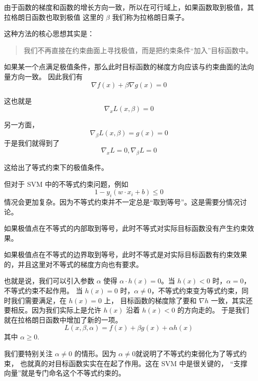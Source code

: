 由于函数的梯度和函数的增长方向一致，所以在可行域上，如果函数取到极值，其拉格朗日函数也取到极值
这里的 $\beta$ 我们称为拉格朗日乘子。

这种方法的核心思想其实是：

\begin{quote}
我们不再直接在约束曲面上寻找极值，而是把约束条件“加入”目标函数中。
\end{quote}

如果某一个点满足极值条件，那么此时目标函数的梯度方向应该与约束曲面的法向量方向一致。
因此我们有
\begin{equation}
\nabla f(x)+\beta \nabla g(x)=0
\end{equation}

这也就是
\begin{equation}
\nabla_x L(x,\beta)=0
\end{equation}

另一方面，
\begin{equation}
\nabla_\beta L(x,\beta) = g(x) = 0
\end{equation}
于是我们就得到了 
\begin{equation}
\nabla_x L = 0, \nabla_\beta L = 0
\end{equation}

这给出了等式约束下的极值条件。

但对于 SVM 中的不等式约束问题，例如
\begin{equation}
1-y_i(w\cdot x_i+b)\le0
\end{equation}
情况会更加复杂。因为不等式约束并不一定总是“取到等号”。这是需要分情况讨论。

如果极值点在不等式的内部取到等号，此时不等式对实际目标函数没有产生约束效果。

如果极值点在不等式的边界取到等号，此时不等式是对实际目标函数有约束效果的，并且这里对不等式的梯度方向也有要求。

也就是说，我们可以引入参数 $\alpha$ 使得 $\alpha \cdot h(x) = 0$。当 $h(x) <0$ 时，$\alpha=0$，不等式约束不起作用。
当 $h(x)=0$ 时，$\alpha \neq 0$，不等式约束变为等式约束，同时我们需要满足，在 $h(x)=0$ 上，
目标函数的梯度除了要和 $\nabla h$ 一致，其实还要相反。因为我们实际上是允许 $h(x)$ 沿着 $h(x)<0$ 的方向走的。
于是我们就在拉格朗日函数中增加了新的一项。
\begin{equation}
L(x, \beta, \alpha) = f(x) + \beta g(x) + \alpha h(x)
\end{equation}
其中 $\alpha \geqslant 0$.

我们要特别关注 $\alpha \neq 0$ 的情形。因为 $\alpha \neq0$就说明了不等式约束弱化为了等式约束，
也就真的对目标函数实实在在起了作用。这在 SVM 中是很关键的，
“支撑向量”就是专门命名这个不等式约束的。

